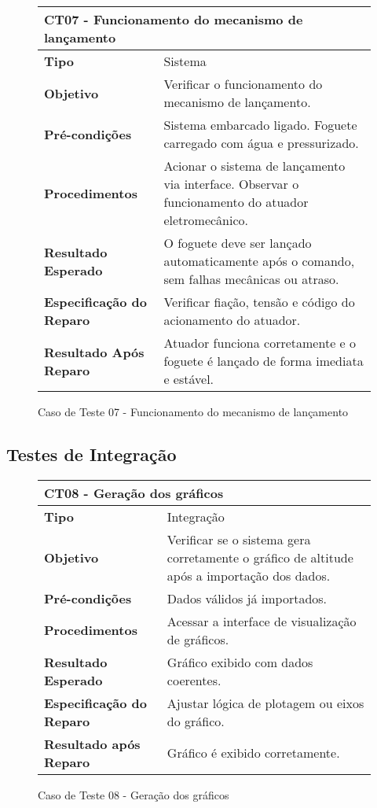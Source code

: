 \begin{figure}[H]
    \centering
\begin{longtable}{|p{}|p{}|}
\hline
\multicolumn{2}{|l|}{\textbf{CT07 - Funcionamento do mecanismo de lançamento}} \\
\hline
\textbf{Tipo} & Sistema \\
\hline
\textbf{Objetivo} & Verificar o funcionamento do mecanismo de lançamento. \\
\hline
\textbf{Pré-condições} & Sistema embarcado ligado.  Foguete carregado com água e pressurizado. \\
\hline
\textbf{Procedimentos} & Acionar o sistema de lançamento via interface.  Observar o funcionamento do atuador eletromecânico. \\
\hline
\textbf{Resultado Esperado} & O foguete deve ser lançado automaticamente após o comando, sem falhas mecânicas ou atraso. \\
\hline
\textbf{Especificação do Reparo} & Verificar fiação, tensão e código do acionamento do atuador. \\
\hline
\textbf{Resultado Após Reparo} & Atuador funciona corretamente e o foguete é lançado de forma imediata e estável. \\
\hline
\end{longtable}
\caption{Caso de Teste 07 - Funcionamento do mecanismo de lançamento}
\label{fig_ct08_funcionamento_mecanismo_lancamento}
\end{figure}

\subsection*{Testes de Integração}

\begin{figure}[H]
    \centering
\begin{longtable}{|p{}|p{}|}
\hline
\multicolumn{2}{|l|}{\textbf{CT08 - Geração dos gráficos}} \\
\hline
\textbf{Tipo} & Integração \\
\hline
\textbf{Objetivo} & Verificar se o sistema gera corretamente o gráfico de altitude após a importação dos dados. \\
\hline
\textbf{Pré-condições} & Dados válidos já importados. \\
\hline
\textbf{Procedimentos} & Acessar a interface de visualização de gráficos. \\
\hline
\textbf{Resultado Esperado} & Gráfico exibido com dados coerentes. \\
\hline
\textbf{Especificação do Reparo} & Ajustar lógica de plotagem ou eixos do gráfico. \\
\hline
\textbf{Resultado após Reparo} & Gráfico é exibido corretamente. \\
\hline
\end{longtable}
\caption{Caso de Teste 08 - Geração dos gráficos}
\label{fig_ct04_geracao_graficos}
\end{figure}

